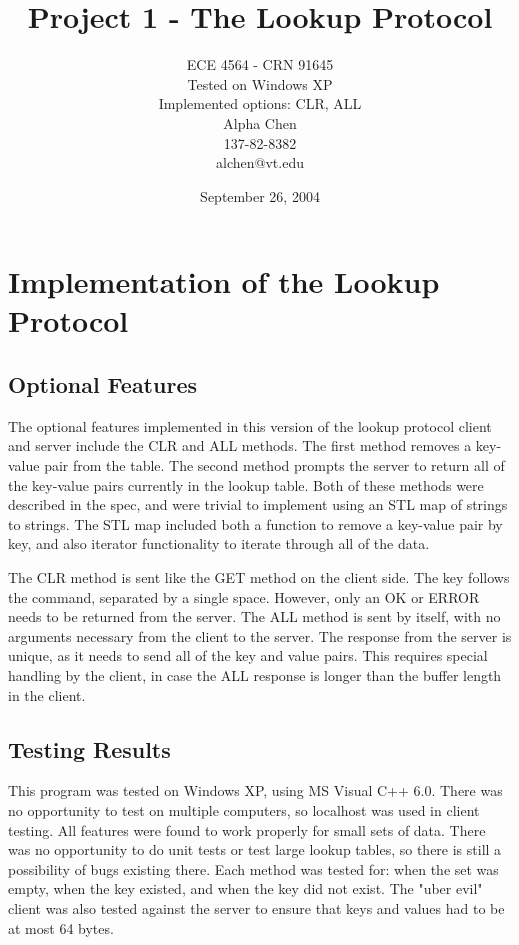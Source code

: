 \documentclass[11pt]{report}
\title{Project 1 - The Lookup Protocol}
\author{ECE 4564 - CRN 91645\\
Tested on Windows XP\\
Implemented options: CLR, ALL\\
Alpha Chen\\
137-82-8382\\
alchen@vt.edu}
\date{September 26, 2004}
\begin{document}
\maketitle

\chapter{Implementation of the Lookup Protocol}

\section{Optional Features}

The optional features implemented in this version of the lookup protocol client and server include the CLR and ALL methods. The first method removes a key-value pair from the table. The second method prompts the server to return all of the key-value pairs currently in the lookup table. Both of these methods were described in the spec, and were trivial to implement using an STL map of strings to strings. The STL map included both a function to remove a key-value pair by key, and also iterator functionality to iterate through all of the data.

The CLR method is sent like the GET method on the client side. The key follows the command, separated by a single space. However, only an OK or ERROR needs to be returned from the server. The ALL method is sent by itself, with no arguments necessary from the client to the server. The response from the server is unique, as it needs to send all of the key and value pairs. This requires special handling by the client, in case the ALL response is longer than the buffer length in the client.

\newpage

\section{Testing Results}

This program was tested on Windows XP, using MS Visual C++ 6.0. There was no opportunity to test on multiple computers, so localhost was used in client testing. All features were found to work properly for small sets of data. There was no opportunity to do unit tests or test large lookup tables, so there is still a possibility of bugs existing there. Each method was tested for: when the set was empty, when the key existed, and when the key did not exist. The "uber evil" client was also tested against the server to ensure that keys and values had to be at most 64 bytes.
\end{document}
